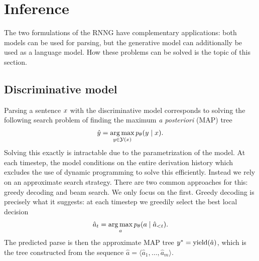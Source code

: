 

\section{Inference}
  The two formulations of the RNNG have complementary applications: both models can be used for parsing, but the generative model can additionally be used as a language model. How these problems can be solved is the topic of this section.

  \subsection{Discriminative model}
    Parsing a sentence $x$ with the discriminative model corresponds to solving the following search problem of finding the maximum \textit{a posteriori} (MAP) tree
    \begin{align*}
      \hat{y} = \operatorname*{arg\,max}_{ y \in \mathcal{Y}(x) } p_{\theta}(y \mid x).
    \end{align*}
    Solving this exactly is intractable due to the parametrization of the model. At each timestep, the model conditions on the entire derivation history which excludes the use of dynamic programming to solve this efficiently. Instead we rely on an approximate search strategy. There are two common approaches for this: greedy decoding and beam search. We only focus on the first. Greedy decoding is precisely what it suggests: at each timestep we greedily select the best local decision
    \begin{align*}
      \hat{a}_t = \operatorname*{arg\,max}_{a} p_{\theta}(a \mid \hat{a}_{< t}).
    \end{align*}
    The predicted parse is then the approximate MAP tree $y^* = \text{yield}(\hat{a})$, which is the tree constructed from the sequence $\hat{a} = \langle \hat{a}_1, \dots, \hat{a}_m \rangle$.

